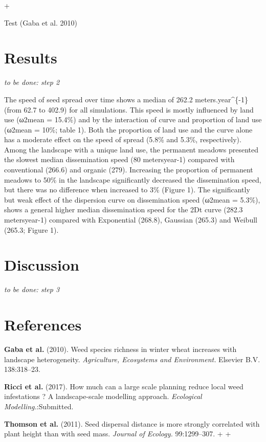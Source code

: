 +\documentclass[12pt]{article}
\begin{document}
Test (Gaba et al. 2010)

\section{Results}\label{results}

\emph{to be done: step 2}

The speed of seed spread over time shows a median of 262.2
meters.year\^{}\{-1\} (from 62.7 to 402.9) for all simulations. This
speed is mostly influenced by land use (ω2mean = 15.4\%) and by the
interaction of curve and proportion of land use (ω2mean = 10\%; table
1). Both the proportion of land use and the curve alone has a moderate
effect on the speed of spread (5.8\% and 5.3\%, respectively). Among the
landscape with a unique land use, the permanent meadows presented the
slowest median dissemination speed (80 metersyear-1) compared with
conventional (266.6) and organic (279). Increasing the proportion of
permanent meadows to 50\% in the landscape significantly decreased the
dissemination speed, but there was no difference when increased to 3\%
(Figure 1). The significantly but weak effect of the dispersion curve on
dissemination speed (ω2mean = 5.3\%), shows a general higher median
dissemination speed for the 2Dt curve (282.3 metersyear-1) compared with
Exponential (268.8), Gaussian (265.3) and Weibull (265.3; Figure 1).

\section{Discussion}\label{discussion}

\emph{to be done: step 3}

\section*{References}\label{references}

\hypertarget{refs}{}
\hypertarget{ref-Gaba2010}{}
\textbf{Gaba et al.} (2010). Weed species richness in winter wheat
increases with landscape heterogeneity. \emph{Agriculture, Ecosystems
and Environment.} Elsevier B.V. 138:318--23.

\hypertarget{ref-Ricci2017}{}
\textbf{Ricci et al.} (2017). How much can a large scale planning reduce
local weed infestations ? A landscape-scale modelling approach.
\emph{Ecological Modelling.}:Submitted.

\hypertarget{ref-Thomson2011}{}
\textbf{Thomson et al.} (2011). Seed dispersal distance is more strongly
correlated with plant height than with seed mass. \emph{Journal of
Ecology.} 99:1299--307.
 +
 +
\end{document}
